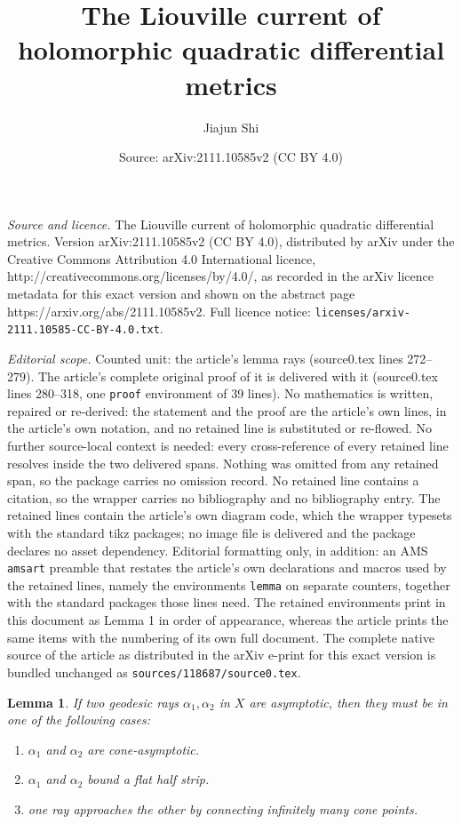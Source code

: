 \documentclass[10pt,a4paper]{amsart}
\title{The Liouville current of holomorphic quadratic differential metrics}
\author{Jiajun Shi}
\date{Source: arXiv:2111.10585v2 (CC BY 4.0)}
\newtheorem{lemma}{Lemma}
\begin{document}
\maketitle

\noindent\emph{Source and licence.} The Liouville current of holomorphic quadratic differential metrics. Version arXiv:2111.10585v2 (CC BY 4.0), distributed by arXiv under the Creative Commons Attribution 4.0 International licence, http://creativecommons.org/licenses/by/4.0/, as recorded in the arXiv licence metadata for this exact version and shown on the abstract page https://arxiv.org/abs/2111.10585v2. Full licence notice: \texttt{licenses/arxiv-2111.10585-CC-BY-4.0.txt}.\par\smallskip

\noindent\textit{Editorial scope.} Counted unit: the article's lemma rays (source0.tex lines 272--279). The article's complete original proof of it is delivered with it (source0.tex lines 280--318, one \texttt{proof} environment of 39 lines). No mathematics is written, repaired or re-derived: the statement and the proof are the article's own lines, in the article's own notation, and no retained line is substituted or re-flowed.  No further source-local context is needed: every cross-reference of every retained line resolves inside the two delivered spans.  Nothing was omitted from any retained span, so the package carries no omission record.  No retained line contains a citation, so the wrapper carries no bibliography and no bibliography entry.  The retained lines contain the article's own diagram code, which the wrapper typesets with the standard tikz packages; no image file is delivered and the package declares no asset dependency.  Editorial formatting only, in addition: an AMS \texttt{amsart} preamble that restates the article's own declarations and macros used by the retained lines, namely the environments \texttt{lemma} on separate counters, together with the standard packages those lines need.  The retained environments print in this document as Lemma 1 in order of appearance, whereas the article prints the same items with the numbering of its own full document.  The complete native source of the article as distributed in the arXiv e-print for this exact version is bundled unchanged as \texttt{sources/118687/source0.tex}.
\begin{lemma}\label{asymptotic rays}
If two geodesic rays $\alpha_1,\alpha_2$ in $X$ are asymptotic, then they must be in one of the following cases:
\begin{enumerate}
    \item[(1)]  $\alpha_1$ and $\alpha_2$ are cone-asymptotic.
    \item[(2)] $\alpha_1$ and $\alpha_2$ bound a flat half strip.
    \item[(3)] one ray approaches the other by connecting infinitely many cone points.
\end{enumerate}
\end{lemma}
\end{document}
